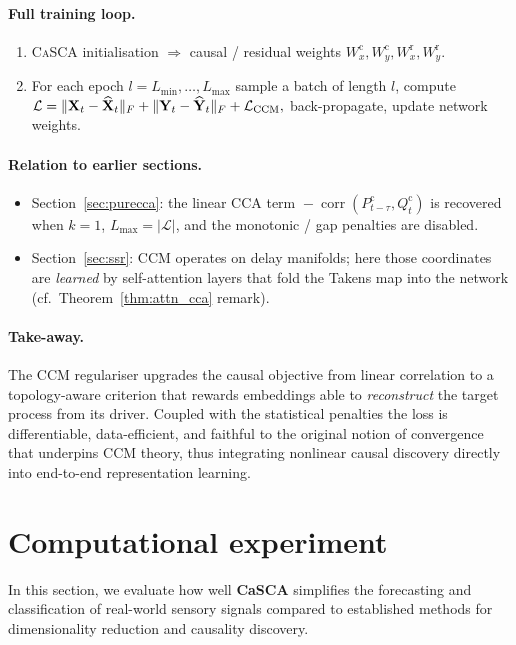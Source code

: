 \documentclass[14pt]{extarticle}
\begin{document}
	\paragraph{Full training loop.}
	\begin{enumerate}[leftmargin=1.5em,noitemsep]
		\item \textsc{CaSCA} initialisation  
		$\Rightarrow$ causal / residual weights
		$W_x^{\mathrm c},W_y^{\mathrm c},W_x^{\mathrm r},W_y^{\mathrm r}$.
		\item For each epoch $l=L_{\min},\dots,L_{\max}$  
		sample a batch of length $l$, compute
		\(
		\mathcal L
		=\|\mathbf{X}_t-\widehat{\mathbf{X}}_t\|_F
		+\|\mathbf{Y}_t-\widehat{\mathbf{Y}}_t\|_F
		+\mathcal L_{\text{CCM}},
		\)
		back-propagate, update network weights.
	\end{enumerate}
	
	\paragraph{Relation to earlier sections.}
	\begin{itemize}[leftmargin=1.4em,itemsep=0.1em]
		\item Section~\ref{sec:purecca}: the linear CCA term
		$\!-\!\operatorname{corr}(P^{\mathrm c}_{t-\tau},Q^{\mathrm c}_t)$
		is recovered when $k=1$, $L_{\max}=|\mathcal L|$, and the
		monotonic / gap penalties are disabled.
		\item Section~\ref{sec:ssr}: CCM operates on delay manifolds; here those
		coordinates are \emph{learned} by self-attention layers
		that fold the Takens map into the network
		(cf.\ Theorem~\ref{thm:attn_cca} remark).
	\end{itemize}
	
	\paragraph{Take-away.}
	The CCM regulariser upgrades the causal objective from linear
	correlation to a topology-aware criterion that rewards embeddings able
	to \emph{reconstruct} the target process from its driver.
	Coupled with the statistical penalties the loss is differentiable,
	data-efficient, and faithful to the original notion of convergence that
	underpins CCM theory, thus integrating nonlinear causal discovery
	directly into end-to-end representation learning.
	
	\section{Computational experiment} \label{sec:experiments}
	In this section, we evaluate how well \textbf{CaSCA} simplifies the forecasting and classification of real-world sensory signals compared to established methods for dimensionality reduction and causality discovery.
	
\end{document}
